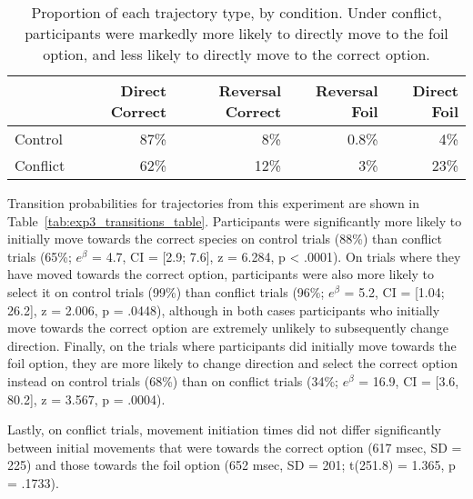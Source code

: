 \begin{table}[h]
  \centering
    \caption[Kinds of trajectory in Experiment 3.]{
    \label{tbl:exp3_trajectories}
    Proportion of each trajectory type, by condition.
    Under conflict, participants were markedly more likely to 
    directly move to the foil option,
    and less likely to directly move to the correct option.
  }
  \begin{tabular}{lrrrr}
    \toprule
             & Direct Correct & Reversal Correct & Reversal Foil & Direct Foil\\
    \midrule
    Control  & 87\%           & 8\%              & 0.8\%         & 4\%\\
    Conflict & 62\%           & 12\%             & 3\%           & 23\%\\
    \bottomrule
  \end{tabular}
\end{table}



Transition probabilities for trajectories from this experiment
are shown in Table~\ref{tab:exp3_transitions_table}.
Participants were significantly more likely to 
initially move towards the correct species on control trials (88\%)
than conflict trials (65\%;
$e^{\beta}$ = 4.7, CI = [2.9; 7.6], z = 6.284, p < .0001).
On trials where they have moved towards the correct option,
participants were also more likely to select it
on control trials (99\%) than conflict trials (96\%;
$e^{\beta}$ = 5.2, CI = [1.04; 26.2], z = 2.006, p = .0448),
although in both cases participants who initially move towards the correct option
are extremely unlikely to subsequently change direction.
Finally, on the trials where participants did initially move towards the foil option,
they are more likely to change direction
and select the correct option instead
on control trials (68\%)
than on conflict trials (34\%;
$e^{\beta}$ = 16.9, CI = [3.6, 80.2], z = 3.567, p = .0004).

Lastly, on conflict trials, movement initiation times
did not differ significantly between
initial movements that were towards the correct option (617 msec, SD = 225)
and those towards the foil option (652 msec, SD = 201;
t(251.8) = 1.365, p = .1733).

